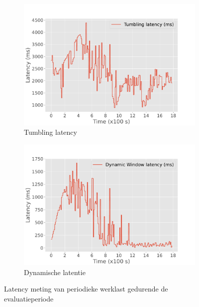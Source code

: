 \begin{figure}
    \begin{subfigure}[b]{\columnwidth}
        \centering
        \includegraphics[width=0.8\columnwidth]{fig/periodic/Tumbling_latency_lineplot.pdf}
        \caption{Tumbling latency }
        \label{fig:periodic_tumbling_lineplot}
    \end{subfigure}

    \begin{subfigure}[b]{\columnwidth}
        \centering
        \includegraphics[width=0.8\columnwidth]{fig/periodic/DynamicWindow_latency_lineplot.pdf}
        \caption{Dynamische latentie }
        \label{fig:periodic_dynamic_lineplot}
    \end{subfigure}
    \caption{Latency meting van periodieke werklast gedurende de evaluatieperiode}
    \label{fig:periodic_latency_lineplot}
\end{figure}

